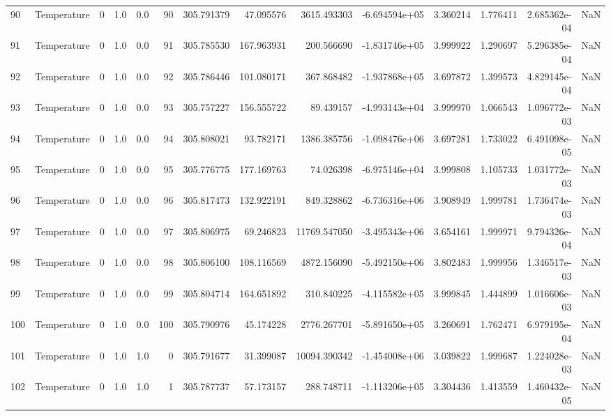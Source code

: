\begin{tabular}{llrrrrrrrrrrrr}
90  &  Temperature &       0 &  1.0 &  0.0 &   90 &  305.791379 &    47.095576 &    3615.493303 & -6.694594e+05 &  3.360214 &  1.776411 &  2.685362e-04 &      NaN \\
91  &  Temperature &       0 &  1.0 &  0.0 &   91 &  305.785530 &   167.963931 &     200.566690 & -1.831746e+05 &  3.999922 &  1.290697 &  5.296385e-04 &      NaN \\
92  &  Temperature &       0 &  1.0 &  0.0 &   92 &  305.786446 &   101.080171 &     367.868482 & -1.937868e+05 &  3.697872 &  1.399573 &  4.829145e-04 &      NaN \\
93  &  Temperature &       0 &  1.0 &  0.0 &   93 &  305.757227 &   156.555722 &      89.439157 & -4.993143e+04 &  3.999970 &  1.066543 &  1.096772e-03 &      NaN \\
94  &  Temperature &       0 &  1.0 &  0.0 &   94 &  305.808021 &    93.782171 &    1386.385756 & -1.098476e+06 &  3.697281 &  1.733022 &  6.491098e-05 &      NaN \\
95  &  Temperature &       0 &  1.0 &  0.0 &   95 &  305.776775 &   177.169763 &      74.026398 & -6.975146e+04 &  3.999808 &  1.105733 &  1.031772e-03 &      NaN \\
96  &  Temperature &       0 &  1.0 &  0.0 &   96 &  305.817473 &   132.922191 &     849.328862 & -6.736316e+06 &  3.908949 &  1.999781 &  1.736474e-03 &      NaN \\
97  &  Temperature &       0 &  1.0 &  0.0 &   97 &  305.806975 &    69.246823 &   11769.547050 & -3.495343e+06 &  3.654161 &  1.999971 &  9.794326e-04 &      NaN \\
98  &  Temperature &       0 &  1.0 &  0.0 &   98 &  305.806100 &   108.116569 &    4872.156090 & -5.492150e+06 &  3.802483 &  1.999956 &  1.346517e-03 &      NaN \\
99  &  Temperature &       0 &  1.0 &  0.0 &   99 &  305.804714 &   164.651892 &     310.840225 & -4.115582e+05 &  3.999845 &  1.444899 &  1.016606e-03 &      NaN \\
100 &  Temperature &       0 &  1.0 &  0.0 &  100 &  305.790976 &    45.174228 &    2776.267701 & -5.891650e+05 &  3.260691 &  1.762471 &  6.979195e-04 &      NaN \\
101 &  Temperature &       0 &  1.0 &  1.0 &    0 &  305.791677 &    31.399087 &   10094.390342 & -1.454008e+06 &  3.039822 &  1.999687 &  1.224028e-03 &      NaN \\
102 &  Temperature &       0 &  1.0 &  1.0 &    1 &  305.787737 &    57.173157 &     288.748711 & -1.113206e+05 &  3.304436 &  1.413559 &  1.460432e-05 &      NaN \\

\end{tabular}
